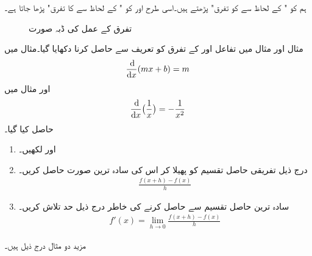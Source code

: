 ہم  کو " کے لحاظ سے  کو تفرق" پڑھتے ہیں۔اسی طرح  اور  کو " کے لحاظ سے  کا تفرق" پڑھا جاتا ہے۔
\begin{figure}
\centering
{}
\caption{تفرق کے عمل کی ڈبہ صورت}
\label{شکل_تفرق_ڈبہ_صورت}
\end{figure}

مثال  اور مثال  میں تفاعل  اور  کے تفرق کو تعریف سے حاصل کرنا دکھایا گیا۔مثال  میں 
\begin{align*}
\frac{\dif}{\dif x}(mx+b)=m
\end{align*}
اور   مثال  میں
\begin{align}
\frac{\dif}{\dif x}\big(\frac{1}{x}\big)=-\frac{1}{x^2}
\end{align}
حاصل کیا گیا۔

\begin{enumerate}[1.]
\item
{} اور  لکھیں۔
\item
درج ذیل تفریقی حاصل تقسیم کو پھیلا کر اس کی سادہ ترین صورت حاصل کریں۔
\begin{align*}
\frac{f(x+h)-f(x)}{h}
\end{align*}
\item
سادہ ترین حاصل تقسیم سے  حاصل کرنے کی خاطر درج ذیل حد تلاش کریں۔
\begin{align*}
f'(x)=\lim_{h\to 0}\frac{f(x+h)-f(x)}{h}
\end{align*}
\end{enumerate}

مزید دو مثال درج ذیل ہیں۔

